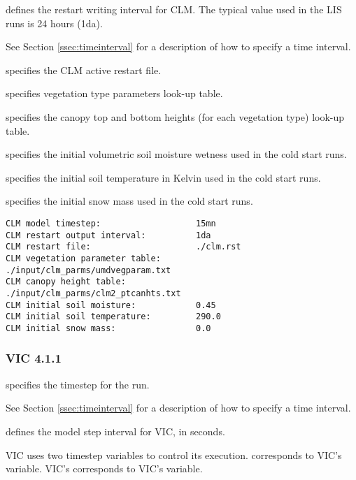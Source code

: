   defines the restart
 writing interval for CLM. The typical value used in the
 LIS runs is 24 hours (1da).

 See Section \ref{ssec:timeinterval} for a description
 of how to specify a time interval.

  specifies the CLM active restart file.

  specifies vegetation type
 parameters look-up table.

  specifies the canopy top and
 bottom heights (for each vegetation type) look-up table.

  specifies the initial volumetric
 soil moisture wetness used in the cold start runs.

  specifies the initial soil
 temperature in Kelvin used in the cold start runs.

  specifies the initial snow mass used
 in the cold start runs.
 

 \begin{Verbatim}[frame=single]
CLM model timestep:                   15mn
CLM restart output interval:          1da
CLM restart file:                     ./clm.rst
CLM vegetation parameter table:       ./input/clm_parms/umdvegparam.txt
CLM canopy height table:              ./input/clm_parms/clm2_ptcanhts.txt
CLM initial soil moisture:            0.45
CLM initial soil temperature:         290.0
CLM initial snow mass:                0.0
 \end{Verbatim}

 
 \subsubsection{VIC 4.1.1} \label{sssec:lsm_vic411}
 

 
  specifies the timestep for the run.

 See Section \ref{ssec:timeinterval} for a description
 of how to specify a time interval.

  defines the model step interval
 for VIC, in seconds.

 VIC uses two timestep variables to control its execution.
  corresponds to VIC's
  variable.  VIC's 
 corresponds to VIC's  variable.

